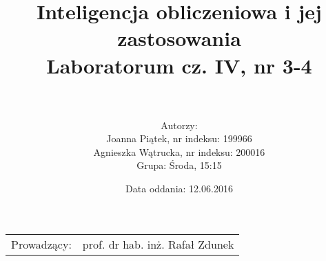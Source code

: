\documentclass{article}
\title{Inteligencja obliczeniowa i jej zastosowania\\
	\vspace{5mm}
	\textbf{Laboratorum cz. IV, nr 3-4}} %
\author{\\
	\\Autorzy:
	\\Joanna Piątek, nr indeksu: 199966
	\\Agnieszka Wątrucka, nr indeksu: 200016
	\\Grupa: Środa, 15:15} %
\date{Data oddania: 12.06.2016}
\begin{document}
\maketitle %

\begin{center}
\begin{tabular}{l r}
Prowadzący: & prof. dr hab. inż. Rafał Zdunek %
\end{tabular}
\end{center}
 
\newpage
\newpage


\newpage

\end{document}

